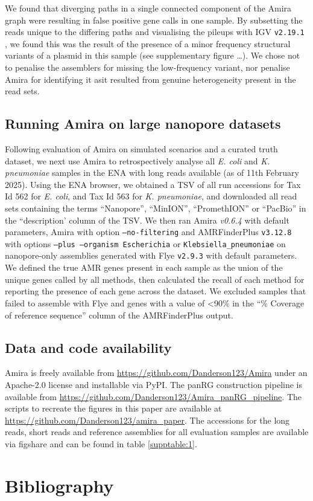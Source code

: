 We found that diverging paths in a single connected component of the Amira graph were resulting in false positive gene calls in one sample. By subsetting the reads unique to the differing paths and visualising the pileups with IGV \texttt{v2.19.1} \cite{10.1093/bib/bbs017}, we found this was the result of the presence of a minor frequency structural variants of a plasmid in this sample (see supplementary figure …). We chose not to penalise the assemblers for missing the low-frequency variant, nor penalise Amira for identifying it asit resulted from genuine heterogeneity present in the read sets.

\subsection*{Running Amira on large nanopore datasets}

Following evaluation of Amira on simulated scenarios and a curated truth dataset, we next use Amira to retrospectively analyse all \textit{E. coli} and \textit{K. pneumoniae} samples in the ENA with long reads available (as of 11th February 2025). Using the ENA browser, we obtained a TSV of all run accessions for Tax Id 562 for \textit{E. coli}, and Tax Id 563 for \textit{K. pneumoniae}, and downloaded all read sets containing the terms “Nanopore”, “MinION”, “PromethION” or “PacBio” in the “description’ column of the TSV. We then ran Amira \textit{v0.6.4} with default parameters, Amira with option \texttt{–no-filtering} and AMRFinderPlus \texttt{v3.12.8} with options \texttt{–plus –organism Escherichia} or \texttt{Klebsiella\_pneumoniae} on nanopore-only assemblies generated with Flye \texttt{v2.9.3} with default parameters. We defined the true AMR genes present in each sample as the union of the unique genes called by all methods, then calculated the recall of each method for reporting the presence of each gene across the dataset. We excluded samples that failed to assemble with Flye and genes with a value of <90\% in the “\% Coverage of reference sequence” column of the AMRFinderPlus output.

\subsection*{Data and code availability}

Amira is freely available from \url{https://github.com/Danderson123/Amira} under an Apache-2.0 license and installable via PyPI. The panRG construction pipeline is available from \url{https://github.com/Danderson123/Amira_panRG_pipeline}. The scripts to recreate the figures in this paper are available at \url{https://github.com/Danderson123/amira_paper}. The accessions for the long reads, short reads and reference assemblies for all evaluation samples are available via figshare and can be found in table \ref{supptable:1}.

\section*{Bibliography}

